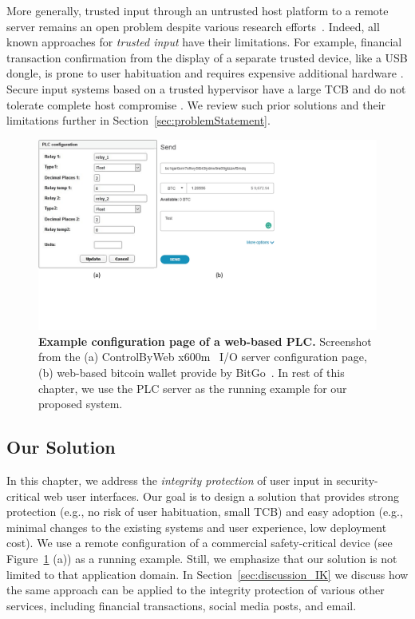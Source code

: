 More generally, trusted input through an untrusted host platform to a remote server remains an open problem despite various research efforts~\cite{sgxio,utp,x86,wimpyKernel,gyrus,weigold2011}. Indeed, all known approaches for \emph{trusted input} have their limitations. For example, financial transaction confirmation from the display of a separate trusted device, like a USB dongle, is prone to user habituation and requires expensive additional hardware \cite{weigold2011}. Secure input systems based on a trusted hypervisor have a large TCB and do not tolerate complete host compromise \cite{sgxio}. We review such prior solutions and their limitations further in Section~\ref{sec:problemStatement}.




\begin{figure}[t]
  \centering
    \includegraphics[trim={0 4cm 10cm 0},clip,width=\linewidth]{chapters/IntegriKey/images/config_pages.pdf}
    \caption[Example configuration page of a web-based PLC]{\textbf{Example configuration page of a web-based PLC.} Screenshot from the (a) ControlByWeb x600m~\cite{controlbyweb} I/O server configuration page, (b) web-based bitcoin wallet provide by BitGo~\cite{bitgo}. In rest of this chapter, we use the PLC server as the running example for our proposed system.}

    \label{fig:PLC}
\end{figure}


\subsection{Our Solution} 

In this chapter, we address the \emph{integrity protection} of user input in security-critical web user interfaces. Our goal is to design a solution that provides strong protection (e.g., no risk of user habituation, small TCB) and easy adoption (e.g., minimal changes to the existing systems and user experience, low deployment cost). We use a remote configuration of a commercial safety-critical device (see Figure~\ref{fig:PLC} (a)) as a running example. Still, we emphasize that our solution is not limited to that application domain. In Section~\ref{sec:discussion_IK} we discuss how the same approach can be applied to the integrity protection of various other services, including financial transactions, social media posts, and email.

